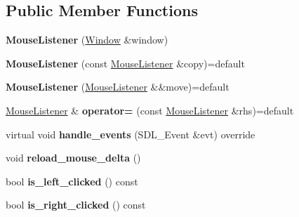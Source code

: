 \subsection*{Public Member Functions}
\begin{DoxyCompactItemize}
\item 
\mbox{\label{class_mouse_listener_a7fb712c02cd32dc0f42d1bcc0835fca8}} 
{\bfseries Mouse\+Listener} (\mbox{\hyperlink{class_window}{Window}} \&window)
\item 
\mbox{\label{class_mouse_listener_ad1c2c314c2efcb7b2f33a214d3ee7ced}} 
{\bfseries Mouse\+Listener} (const \mbox{\hyperlink{class_mouse_listener}{Mouse\+Listener}} \&copy)=default
\item 
\mbox{\label{class_mouse_listener_af1b3ec4e87f6843e164a6759ca4d58a8}} 
{\bfseries Mouse\+Listener} (\mbox{\hyperlink{class_mouse_listener}{Mouse\+Listener}} \&\&move)=default
\item 
\mbox{\label{class_mouse_listener_a1846b959ffaab4132f4b22ecd7e8a10e}} 
\mbox{\hyperlink{class_mouse_listener}{Mouse\+Listener}} \& {\bfseries operator=} (const \mbox{\hyperlink{class_mouse_listener}{Mouse\+Listener}} \&rhs)=default
\item 
\mbox{\label{class_mouse_listener_a6ec65116dd06555fbc26ce34bb79e6d4}} 
virtual void {\bfseries handle\+\_\+events} (S\+D\+L\+\_\+\+Event \&evt) override
\item 
\mbox{\label{class_mouse_listener_a9beb1f6d4e96becbba80457977bd5a42}} 
void {\bfseries reload\+\_\+mouse\+\_\+delta} ()
\item 
\mbox{\label{class_mouse_listener_ad94ea396519a130637e3d5edefa327c2}} 
bool {\bfseries is\+\_\+left\+\_\+clicked} () const
\item 
\mbox{\label{class_mouse_listener_aad89212527f27f3b0876a9e7f3c61085}} 
bool {\bfseries is\+\_\+right\+\_\+clicked} () const
\item 
\mbox{\label{class_mouse_listener_a31c56e6e842d815cc5f88fa015d68899}} 

\end{DoxyCompactItemize}
